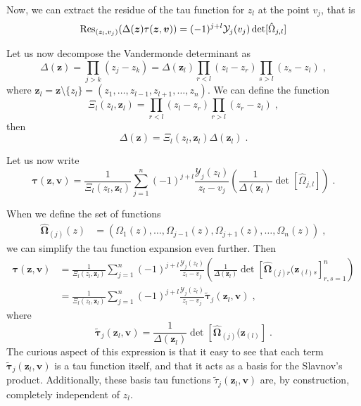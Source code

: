 \documentclass[a4paper,11pt]{amsart}
\begin{document}
Now, we can extract the residue of the tau function for \(z_l\) at the point \(v_j\), that is
\begin{equation}
  \operatorname{Res}_{(z_l, v_j)}(\Delta(\bm{z})\tau(\bm{z}, \bm{v})) = (-1)^{j+l} \mathcal{Y}_j(v_j) \det[\hat{\Omega}_{j, l}]
\end{equation}

Let us now decompose the Vandermonde determinant as
\begin{equation}
  \Delta(\bm{z}) = \prod_{j>k}(z_j - z_k) = \Delta(\bm{z}_l) \prod_{r<l}(z_l - z_r) \prod_{s>l}(z_s - z_l)\; ,
\end{equation}
where \(\bm{z}_l = \bm{z}\setminus \{z_l\} = (z_1, \dots, z_{l-1}, z_{l+1}, \dots, z_n) \).
We can define the function
\begin{equation}
  \Xi_l(z_l,\bm{z}_l) = \prod_{r<l}(z_l - z_r) \prod_{r>l}(z_r - z_l)\; , 
\end{equation}
then 
\begin{equation}
  \Delta(\bm{z}) = \Xi_l(z_l, \bm{z}_l) \Delta(\bm{z}_l) \; .
\end{equation}

Let us now write
\begin{equation}
  \bm{\tau}(\bm{z}, \bm{v})
   = \frac{1}{\Xi_l(z_l, \bm{z}_l)} \sum_{j=1}^n (-1)^{j + l} \frac{\mathcal{Y}_j(z_l)}{z_l - v_j} 
\left(\frac{1}{\Delta(\bm{z}_l)} \det[\hat{\Omega}_{j, l}]\right)\; .
\end{equation}

When we define the set of functions
\begin{equation}
  \begin{split}
  \hat{\bm{\Omega}}_{(j)}(z) & = \left(\Omega_1(z), \dots, \Omega_{j-1}(z), \Omega_{j+1}(z), \dots, \Omega_n(z) \right)\; ,
  \end{split}
\end{equation}
we can simplify the tau function expansion even further. Then
\begin{equation}
\begin{split}
  \bm{\tau}(\bm{z}, \bm{v})
  & = \frac{1}{\Xi_l(z_l, \bm{z}_l)} \sum_{j=1}^n (-1)^{j + l} \frac{\mathcal{Y}_j(z_l)}{z_l - v_j} 
    \left(\frac{1}{\Delta(\bm{z}_l)} \det[\hat{\bm{\Omega}}_{(j) r}(\bm{z}_{(l) s} ]_{r, s=1}^n\right)\\ 
  & = \frac{1}{\Xi_l(z_l, \bm{z}_l)} \sum_{j=1}^n (-1)^{j + l} \frac{\mathcal{Y}_j(z_l)}{z_l - v_j} 
    \tilde{\bm{\tau}}_j(\bm{z}_l, \bm{v})\; ,
\end{split}
\end{equation}
where 
\begin{equation}
  \label{eq:basis-tau}
    \tilde{\bm{\tau}}_j(\bm{z}_l, \bm{v}) = 
\frac{1}{\Delta(\bm{z}_l)} \det[\hat{\bm{\Omega}}_{(j)}(\bm{z}_{(l)} ]\; .
\end{equation}
The curious aspect of this expression is that it easy to see that each term  
\(\tilde{\bm{\tau}}_j(\bm{z}_l, \bm{v})\) is a tau function itself, and that
it acts as a basis for the Slavnov's product. 
Additionally, these basis tau functions \(\tilde{\tau}_j(\bm{z}_l,
\bm{v})\) are, by construction, completely independent of \(z_l\).
\end{document}
